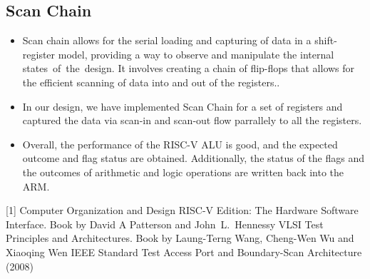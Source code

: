 \documentclass[a4paper,12pt,english]{report}
\begin{document}
\begin{enumerate}
\section{Scan Chain}
\begin{itemize}
    \item Scan chain allows for the serial loading and capturing of data in a shift-register model, providing a way to observe and manipulate the internal states of the design. It involves creating a chain of flip-flops that allows for the efficient scanning of data into and out of the registers..
    \item In our design, we have implemented Scan Chain for a set of registers and captured the data via scan-in and scan-out flow parrallely to all the registers.
    \item Overall, the performance of the RISC-V ALU is good, and the expected outcome and flag status are obtained. Additionally, the status of the flags and the outcomes of arithmetic and logic operations are written back into the ARM. 
\end{itemize}
\newpage


[1] Computer Organization and Design RISC-V Edition: The Hardware Software Interface. Book by David A Patterson and John L. Hennessy \newline
[2] VLSI Test Principles and Architectures. Book by Laung-Terng Wang, Cheng-Wen Wu and Xiaoqing Wen \newline
[3] IEEE Standard Test Access Port and 
Boundary-Scan Architecture (2008)
\end{enumerate}
\end{document}
